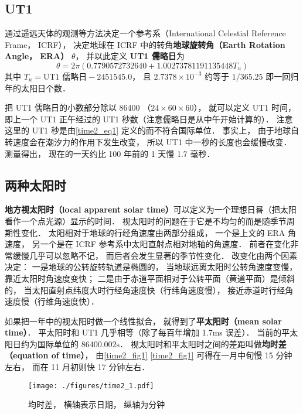 

\subsection{UT1}
通过遥远天体的观测等方法决定一个参考系（International Celestial Reference Frame， ICRF）， 决定地球在 ICRF 中的转角\textbf{地球旋转角（Earth Rotation Angle， ERA）} $\theta$， 并以此定义 \textbf{UT1 儒略日}为
\begin{equation}\label{time2_eq1}
\theta = 2\pi(0.7790572732640 + 1.00273781191135448 T_u)
\end{equation}
其中 $T_u = \text{UT1 儒略日} - 2451545.0$， 且 $2.7378\times 10^{-3}$ 约等于 $1/365.25$ 即一回归年的太阳日个数．

把 UT1 儒略日的小数部分除以 86400 （$24\times 60\times 60$）， 就可以定义 UT1 时间， 即上一个 UT1 正午经过的 UT1 秒数（注意儒略日是从中午开始计算的）． 注意这里的 UT1 秒是由\autoref{time2_eq1} 定义的而不符合国际单位． 事实上， 由于地球自转速度会在潮汐力的作用下发生改变， 所以 UT1 中一秒的长度也会缓慢改变． 测量得出， 现在的一天约比 100 年前的 1 天慢 1.7 毫秒．

\subsection{两种太阳时}
\textbf{地方视太阳时（local apparent solar time）}可以定义为一个理想日晷（把太阳看作一个点光源）显示的时间． 视太阳时的问题在于它是不均匀的而是随季节周期性变化． 太阳相对于地球的行经角速度由两部分组成， 一个是上文的 ERA 角速度， 另一个是在 ICRF 参考系中太阳直射点相对地轴的角速度． 前者在变化非常缓慢几乎可以忽略不记， 而后者会发生显著的季节性变化． 改变化由两个因素决定： 一是地球的公转旋转轨道是椭圆的， 当地球远离太阳时公转角速度变慢， 靠近太阳时角速度变快； 二是由于赤道平面相对于公转平面（黄道平面）是倾斜的， 当太阳直射点纬度大时行经角速度快（行纬角速度慢）， 接近赤道时行经角速度慢（行维角速度快）．

如果把一年中的视太阳时做一个线性拟合， 就得到了\textbf{平太阳时（mean solar time）}． 平太阳时和 UT1 几乎相等（除了每百年增加 1.7ms 误差）． 当前的平太阳日约为国际单位的 $86400.002\mathrm{s}$． 视太阳时和平太阳时之间的差距叫做\textbf{均时差（equation of time）}， 由\autoref{time2_fig1} \autoref{time2_fig1} 可得在一月中旬慢 15 分钟左右， 而在 11 月初则快 17 分钟左右．

\begin{figure}[ht]
\centering
\texttt{[image: ./figures/time2\_1.pdf]}
\caption{均时差， 横轴表示日期， 纵轴为分钟} \label{time2_fig1}
\end{figure}
